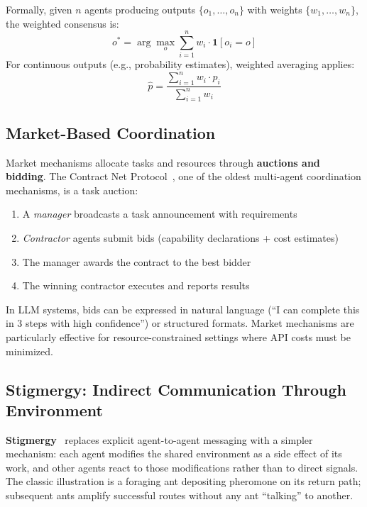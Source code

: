 Formally, given $n$ agents producing outputs $\{o_1, \ldots, o_n\}$ with weights $\{w_1, \ldots, w_n\}$, the weighted consensus is: 
\begin{equation}
  o^* = \arg\max_{o} \sum_{i=1}^{n} w_i \cdot \mathbf{1}[o_i = o]
\end{equation}
 For continuous outputs (e.g., probability estimates), weighted averaging applies: 
\begin{equation}
  \hat{p} = \frac{\sum_{i=1}^{n} w_i \cdot p_i}{\sum_{i=1}^{n} w_i}
\end{equation}

\subsection{Market-Based Coordination}
\label{subsubsec:market-based}

Market mechanisms allocate tasks and resources through \textbf{auctions and bidding}. The Contract Net Protocol~\cite{smith1980contract}, one of the oldest multi-agent coordination mechanisms, is a task auction:

\begin{enumerate}
  \item A \emph{manager} broadcasts a task announcement with requirements
  \item \emph{Contractor} agents submit bids (capability declarations + cost estimates)
  \item The manager awards the contract to the best bidder
  \item The winning contractor executes and reports results
\end{enumerate}

In LLM systems, bids can be expressed in natural language (``I can complete this in 3 steps with high confidence'') or structured formats. Market mechanisms are particularly effective for resource-constrained settings where API costs must be minimized.

\subsection{Stigmergy: Indirect Communication Through Environment}
\label{subsubsec:stigmergy}

\textbf{Stigmergy}~\cite{grassé1959reconstruction} replaces explicit agent-to-agent messaging with a simpler mechanism: each agent modifies the shared environment as a side effect of its work, and other agents react to those modifications rather than to direct signals. The classic illustration is a foraging ant depositing pheromone on its return path; subsequent ants amplify successful routes without any ant ``talking'' to another.

